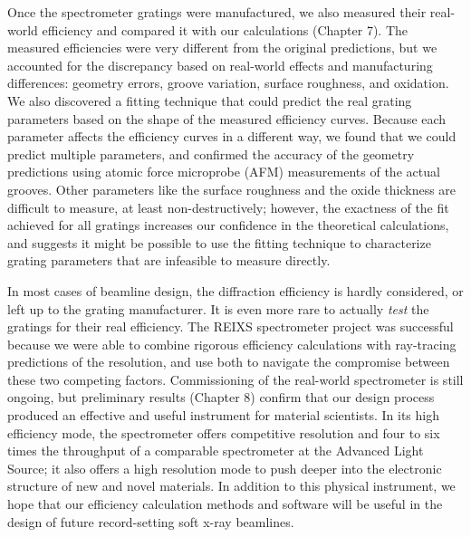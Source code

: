 \documentclass[12pt]{uofsthesis-cs}
\begin{document}
Once the spectrometer gratings were manufactured, we also measured their real-world efficiency and compared it with our calculations (Chapter 7).  The measured efficiencies were very different from the original predictions, but we accounted for the discrepancy based on real-world effects and manufacturing differences: geometry errors, groove variation, surface roughness, and oxidation.  We also discovered a fitting technique that could predict the real grating parameters based on the shape of the measured efficiency curves.  Because each parameter affects the efficiency curves in a different way, we found that we could predict multiple parameters, and confirmed the accuracy of the geometry predictions using atomic force microprobe (AFM) measurements of the actual grooves.  Other parameters like the surface roughness and the oxide thickness are difficult to measure, at least non-destructively; however, the exactness of the fit achieved for all gratings increases our confidence in the theoretical calculations, and suggests it might be possible to use the fitting technique to characterize grating parameters that are infeasible to measure directly.

In most cases of beamline design, the diffraction efficiency is hardly considered, or left up to the grating manufacturer.  It is even more rare to actually {\emph{test}} the gratings for their real efficiency.  The REIXS spectrometer project was successful because we were able to combine rigorous efficiency calculations with ray-tracing predictions of the resolution, and use both to navigate the compromise between these two competing factors.  Commissioning of the real-world spectrometer is still ongoing, but preliminary results (Chapter 8) confirm that our design process produced an effective and useful instrument for material scientists.  In its high efficiency mode, the spectrometer offers competitive resolution and four to six times the throughput of a comparable spectrometer at the Advanced Light Source; it also offers a high resolution mode to push deeper into the electronic structure of new and novel materials.  In addition to this physical instrument, we hope that our efficiency calculation methods and software will be useful in the design of future record-setting soft x-ray beamlines.

%







\end{document}

